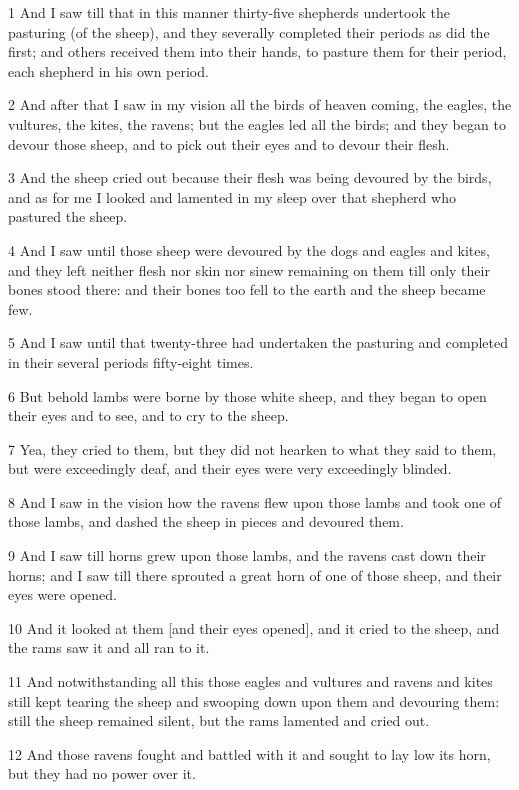 \par 1 And I saw till that in this manner thirty-five shepherds undertook the pasturing (of the sheep), and they severally completed their periods as did the first; and others received them into their hands, to pasture them for their period, each shepherd in his own period.
\par 2 And after that I saw in my vision all the birds of heaven coming, the eagles, the vultures, the kites, the ravens; but the eagles led all the birds; and they began to devour those sheep, and to pick out their eyes and to devour their flesh.
\par 3 And the sheep cried out because their flesh was being devoured by the birds, and as for me I looked and lamented in my sleep over that shepherd who pastured the sheep.
\par 4 And I saw until those sheep were devoured by the dogs and eagles and kites, and they left neither flesh nor skin nor sinew remaining on them till only their bones stood there: and their bones too fell to the earth and the sheep became few.
\par 5 And I saw until that twenty-three had undertaken the pasturing and completed in their several periods fifty-eight times.
\par 6 But behold lambs were borne by those white sheep, and they began to open their eyes and to see, and to cry to the sheep.
\par 7 Yea, they cried to them, but they did not hearken to what they said to them, but were exceedingly deaf, and their eyes were very exceedingly blinded.
\par 8 And I saw in the vision how the ravens flew upon those lambs and took one of those lambs, and dashed the sheep in pieces and devoured them.
\par 9 And I saw till horns grew upon those lambs, and the ravens cast down their horns; and I saw till there sprouted a great horn of one of those sheep, and their eyes were opened.
\par 10 And it looked at them [and their eyes opened], and it cried to the sheep, and the rams saw it and all ran to it.
\par 11 And notwithstanding all this those eagles and vultures and ravens and kites still kept tearing the sheep and swooping down upon them and devouring them: still the sheep remained silent, but the rams lamented and cried out.
\par 12 And those ravens fought and battled with it and sought to lay low its horn, but they had no power over it.
